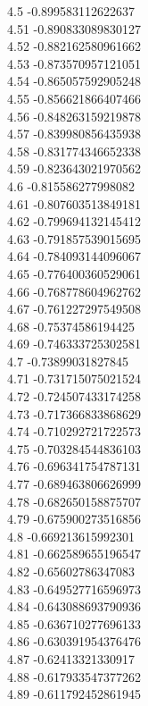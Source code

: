 {4.5	-0.899583112622637\\
4.51	-0.890833089830127\\
4.52	-0.882162580961662\\
4.53	-0.873570957121051\\
4.54	-0.865057592905248\\
4.55	-0.856621866407466\\
4.56	-0.848263159219878\\
4.57	-0.839980856435938\\
4.58	-0.831774346652338\\
4.59	-0.823643021970562\\
4.6	-0.815586277998082\\
4.61	-0.807603513849181\\
4.62	-0.799694132145412\\
4.63	-0.791857539015695\\
4.64	-0.784093144096067\\
4.65	-0.776400360529061\\
4.66	-0.768778604962762\\
4.67	-0.761227297549508\\
4.68	-0.75374586194425\\
4.69	-0.746333725302581\\
4.7	-0.73899031827845\\
4.71	-0.731715075021524\\
4.72	-0.724507433174258\\
4.73	-0.717366833868629\\
4.74	-0.710292721722573\\
4.75	-0.703284544836103\\
4.76	-0.696341754787131\\
4.77	-0.689463806626999\\
4.78	-0.682650158875707\\
4.79	-0.675900273516856\\
4.8	-0.669213615992301\\
4.81	-0.662589655196547\\
4.82	-0.65602786347083\\
4.83	-0.649527716596973\\
4.84	-0.643088693790936\\
4.85	-0.636710277696133\\
4.86	-0.630391954376476\\
4.87	-0.62413321330917\\
4.88	-0.617933547377262\\
4.89	-0.611792452861945\\
}
